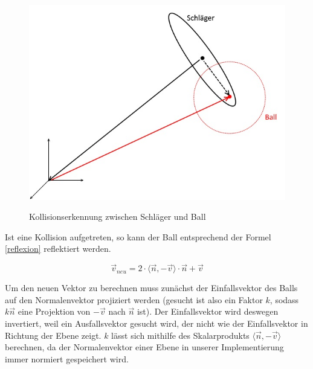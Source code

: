 \begin{figure}[h]
   \begin{center}
    \includegraphics[scale=0.4]{bilder/collisionRacket}\label{fig_colRacket}
   \end{center} 
    \caption{Kollisionserkennung zwischen Schläger und Ball}
        \label{fig_colRacket2}
\end{figure} 

Ist eine Kollision aufgetreten, so kann der Ball entsprechend der Formel \ref{reflexion} reflektiert werden.

\begin{equation}	
\label{reflexion}
	\vec{v}_{neu} = 2 \cdot \langle \vec{n},-\vec{v} \rangle \cdot \vec{n} + \vec{v}
\end{equation}

Um den neuen Vektor zu berechnen muss zunächst der Einfallsvektor des Balls auf den Normalenvektor projiziert werden (gesucht ist also ein Faktor $k$, sodass $k\vec{n}$ eine Projektion von $-\vec{v}$ nach $\vec{n}$ ist). Der Einfallsvektor wird deswegen invertiert, weil ein Ausfallsvektor gesucht wird, der nicht wie der Einfallsvektor in Richtung der Ebene zeigt. $k$ lässt sich mithilfe des Skalarprodukts $\langle\vec{n},-\vec{v}\rangle$ berechnen, da der Normalenvektor einer Ebene in unserer Implementierung immer normiert gespeichert wird.



